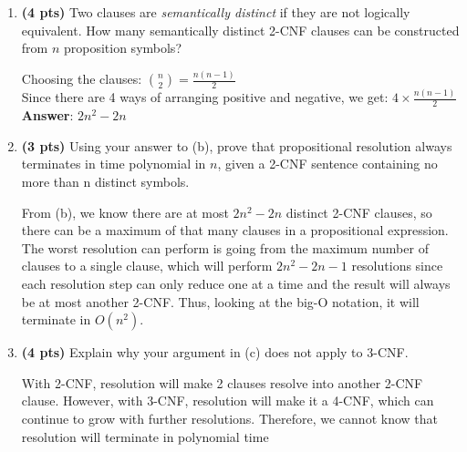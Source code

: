 \documentclass{article}
\begin{document}
\begin{enumerate}
\begin{enumerate}[label=($\alph*$)]


    \item \textbf{(4 pts)} Two clauses are \textit{semantically distinct} if they are not logically equivalent. How many semantically distinct 2-CNF clauses can be constructed from $n$ proposition symbols?

    \color{blue}
        Choosing the clauses: $\binom n2=\frac{n(n-1)}{2}$\\
        Since there are 4 ways of arranging positive and negative, we get: $4 \times \frac{n(n-1)}{2}$\\
        \textbf{Answer}: $2n^2-2n$
    \color{black}



    \item \textbf{(3 pts)} Using your answer to (b), prove that propositional resolution always terminates in time polynomial in $n$, given a 2-CNF sentence containing no more than n distinct symbols.

    \color{blue}
        From (b), we know there are at most $2n^2-2n$ distinct 2-CNF clauses, so there can be a maximum of that many clauses in a propositional expression. The worst resolution can perform is going from the maximum number of clauses to a single clause, which will perform $2n^2-2n-1$ resolutions since each resolution step can only reduce one at a time and the result will always be at most another 2-CNF. Thus, looking at the big-O notation, it will terminate in $O(n^2)$.
    \color{black}



    \item \textbf{(4 pts)} Explain why your argument in (c) does not apply to 3-CNF.

    \color{blue}
        With 2-CNF, resolution will make 2 clauses resolve into another 2-CNF clause. However, with 3-CNF, resolution will make it a 4-CNF, which can continue to grow with further resolutions. Therefore, we cannot know that resolution will terminate in polynomial time
    \color{black}


\end{enumerate}
\end{enumerate}
\end{document}
